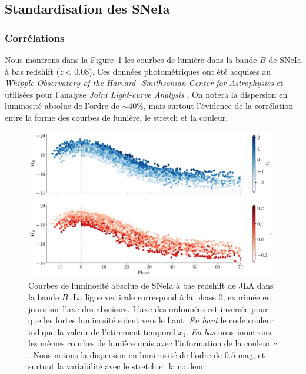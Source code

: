 \documentclass[../main/main.tex]{subfiles}
\begin{document}
\subsection{Standardisation des SNeIa}\label{ssec:salt2}

\subsubsection{Corrélations}

Nous montrons dans la Figure~\ref{fig:lc_jla} les courbes de lumière
dans la bande $B$ de SNeIa à bas redshift ($z<0.08$). Ces données
photométriques ont été acquises au \textit{Whipple Observatory of the
  Harvard- Smithsonian Center for Astrophysics}
\citep[CfA3,][]{Hicken2009} et utilisées pour l'analyse \textit{Joint Light-curve Analysis}
\citep[JLA,][]{Betoule2014}.  On notera la dispersion en luminosité absolue de
l'ordre de $\sim40\%$, mais surtout l'évidence de la corrélation entre
la forme des courbes de lumière, le stretch et la couleur. 

\begin{figure}[ht]
  \centering
  \includegraphics[width=0.99\textwidth]{../figures/01bis_sne/lc_JLA.pdf}
  \caption[Courbes de lumière de SNeIa à bas redshift de JLA.]{Courbes
    de luminosité absolue de SNeIa à bas redshift de JLA dans la bande $B$ .La ligne verticale correspond à la
    phase $0$, exprimée en jours sur l'axe des abscisses. L'axe des
    ordonnées est inversée pour que les fortes luminosité soient vers le
    haut. \emph{En haut} le code
    couleur indique la valeur de l'étirement temporel $x_{1}$. \emph{En
      bas} nous montrons les mêmes courbes de lumière mais avec
    l'information de la couleur $c$. Nous notons la dispersion en
    luminosité de l'odre de $0.5$ mag, et surtout la variabilité avec le
  stretch et la couleur.}
  \label{fig:lc_jla}
\end{figure}
\end{document}
